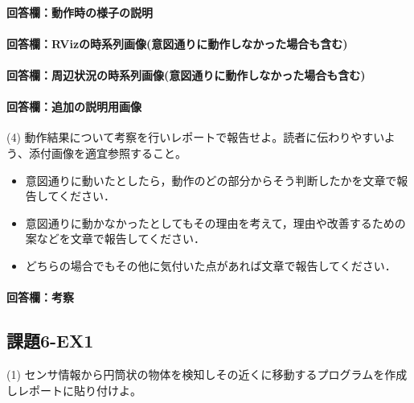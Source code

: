 \documentclass[12pt, xelatex,ja=standard,jafont=noto]{bxjsarticle}
\newif\ifdraft
\begin{document}
\paragraph{回答欄：動作時の様子の説明}
\ifdraft
動作時の様子を説明する文章を記載する．図、写真などをふんだんにとりいれること。
\fi

\paragraph{回答欄：RVizの時系列画像(意図通りに動作しなかった場合も含む)}
\ifdraft
RVizの時系列画像を貼り付ける
\fi

\paragraph{回答欄：周辺状況の時系列画像(意図通りに動作しなかった場合も含む)}
\ifdraft
周辺状況の時系列画像を貼り付ける
\fi

\paragraph{回答欄：追加の説明用画像}
\ifdraft
説明に必要な追加画像があれば貼り付ける
\fi

\begin{itembox}[l]{(4)}
動作結果について考察を行いレポートで報告せよ。読者に伝わりやすいよう、添付画像を適宜参照すること。
\begin{itemize}
    \item 意図通りに動いたとしたら，動作のどの部分からそう判断したかを文章で報告してください．
    \item 意図通りに動かなかったとしてもその理由を考えて，理由や改善するための案などを文章で報告してください．
    \item どちらの場合でもその他に気付いた点があれば文章で報告してください．
\end{itemize}
\end{itembox}

\paragraph{回答欄：考察}
\ifdraft
詳しい考察を記載する。
\fi

\subsection{課題6-EX1}
\begin{itembox}[l]{(1)}
センサ情報から円筒状の物体を検知しその近くに移動するプログラムを作成しレポートに貼り付けよ。
\end{itembox}
\end{document}
